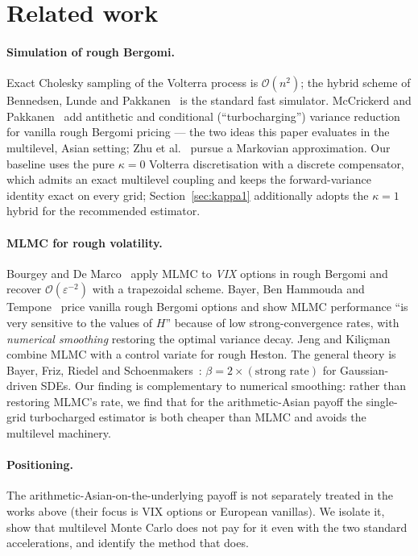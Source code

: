 \documentclass[11pt]{article}
\begin{document}
\section{Related work}
\label{sec:related}

\paragraph{Simulation of rough Bergomi.}
Exact Cholesky sampling of the Volterra process is $\mathcal{O}(n^2)$; the hybrid scheme
of Bennedsen, Lunde and Pakkanen~\cite{blp2017} is the standard fast simulator. McCrickerd
and Pakkanen~\cite{mccrickerd2018} add antithetic and conditional (``turbocharging'')
variance reduction for vanilla rough Bergomi pricing --- the two ideas this paper evaluates
in the multilevel, Asian setting; Zhu et al.~\cite{zhu2021} pursue a Markovian
approximation. Our baseline uses the pure $\kappa=0$ Volterra discretisation with a
discrete compensator, which admits an exact multilevel coupling and keeps the
forward-variance identity exact on every grid; Section~\ref{sec:kappa1} additionally adopts
the $\kappa=1$ hybrid for the recommended estimator.

\paragraph{MLMC for rough volatility.}
Bourgey and De Marco~\cite{bourgey2021} apply MLMC to \emph{VIX} options in rough Bergomi
and recover $\mathcal{O}(\varepsilon^{-2})$ with a trapezoidal scheme. Bayer, Ben Hammouda
and Tempone~\cite{bht2020} price vanilla rough Bergomi options and show MLMC performance
``is very sensitive to the values of $H$'' because of low strong-convergence rates, with
\emph{numerical smoothing} restoring the optimal variance decay. Jeng and
Kili\c{c}man~\cite{jk2021} combine MLMC with a control variate for rough Heston. The
general theory is Bayer, Friz, Riedel and Schoenmakers~\cite{bfrs2016}:
$\beta=2\times(\text{strong rate})$ for Gaussian-driven SDEs. Our finding is complementary
to numerical smoothing: rather than restoring MLMC's rate, we find that for the
arithmetic-Asian payoff the single-grid turbocharged estimator is both cheaper than MLMC
and avoids the multilevel machinery.

\paragraph{Positioning.}
The arithmetic-Asian-on-the-underlying payoff is not separately treated in the works above
(their focus is VIX options or European vanillas). We isolate it, show that multilevel
Monte Carlo does not pay for it even with the two standard accelerations, and identify the
method that does.
\end{document}
